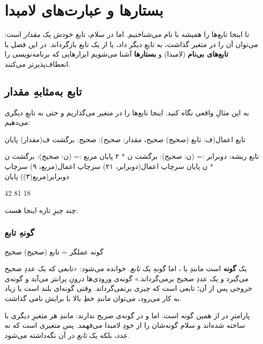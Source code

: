 \chapter{بستارها و عبارت‌های لامبدا}%
\label{ch:lambdas}

تا اینجا تابع‌ها را همیشه با نام می‌شناختیم. اما در سلام، تابع خودش یک \emph{مقدار}
است: می‌توان آن را در متغیر گذاشت، به تابعِ دیگر داد، یا از یک تابع
بازگرداند. در این فصل با \textbf{تابع‌های بی‌نام} (لامبدا) و \textbf{بستارها}
آشنا می‌شویم ابزارهایی که برنامه‌نویسی را انعطاف‌پذیرتر می‌کنند.

\section{تابع به‌مثابهِ مقدار}

به این مثالِ واقعی نگاه کنید. اینجا تابع‌ها را در متغیر می‌گذاریم و حتی به تابعِ
دیگری می‌دهیم:

\begin{salamfa}
تابع اعمال(ف: تابع (صحیح) صحیح، مقدار: صحیح): صحیح:
    برگشت ف(مقدار)
پایان

تابع ریشه:
    دوبرابر := (ن: صحیح): برگشت ن * ۲ پایان
    مربع := (ن: صحیح): برگشت ن * ن پایان
    سرچاپ اعمال(دوبرابر، ۲۱)
    سرچاپ اعمال(مربع، ۹)
    سرچاپ دوبرابر(مربع(۳))
پایان
\end{salamfa}

\begin{progoutfa}
42
81
18
\end{progoutfa}

چند چیزِ تازه اینجا هست:

\subsection{گونهِ تابع}

\begin{salamfa}
گونه عملگر = تابع (صحیح) صحیح
\end{salamfa}

 یک \textbf{گونه} است مانندِ  یا ،
اما گونهِ یک \emph{تابع}. خوانده می‌شود: «تابعی که یک عددِ صحیح می‌گیرد و یک
عددِ صحیح برمی‌گرداند.» گونه‌ی ورودی‌ها درونِ پرانتز می‌آید و گونه‌ی خروجی پس
از آن؛  تابعی است که چیزی برنمی‌گرداند. وقتی گونه‌ای بلند است
یا زیاد به کار می‌رود، می‌توان مانندِ خطِ بالا با  برایش نامی گذاشت.

پارامترِ  در  از همین گونه است. اما  و
 در  گونه‌ی صریح ندارند: مانندِ هر متغیرِ دیگری با
\code{:=} ساخته شده‌اند و سلام گونه‌شان را از خودِ لامبدا می‌فهمد. پس
 متغیری است که نه عدد، بلکه یک \emph{تابع} در آن نگه‌داشته می‌شود.

